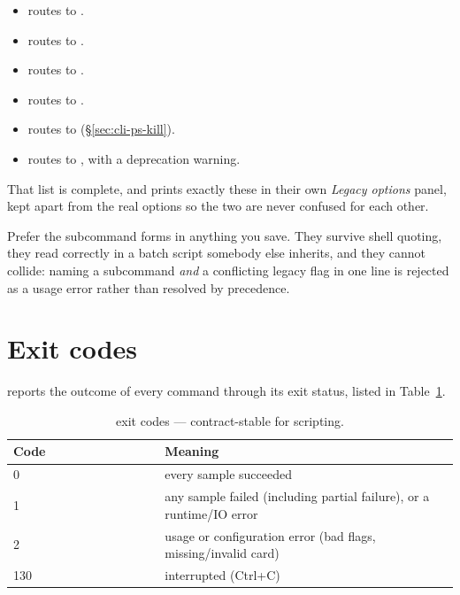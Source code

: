 \begin{itemize}
  \item {} routes to .
  \item {} routes to .
  \item {} routes to .
  \item {} routes to .
  \item {} routes to  (\S\ref{sec:cli-ps-kill}).
  \item {} routes to , with a deprecation
        warning.
\end{itemize}

That list is complete, and  prints exactly these in their own
\emph{Legacy options} panel, kept apart from the real options so the two are never
confused for each other.

Prefer the subcommand forms in anything you save. They survive shell quoting, they read
correctly in a batch script somebody else inherits, and they cannot collide: naming a
subcommand \emph{and} a conflicting legacy flag in one line is rejected as a usage error
rather than resolved by precedence.

\section{Exit codes}
\label{sec:exit-codes}

 reports the outcome of every command through its exit status, listed in
Table~\ref{tab:exit-codes}.

\begin{table}[ht]
  \footnotesize
  \begingroup
  \setlength{\tabcolsep}{0pt}
  \begin{tabular}{@{}p{0.34\linewidth}p{0.66\linewidth}@{}}
    \toprule
    \textbf{Code} & \textbf{Meaning} \\
    \midrule
    0   & every sample succeeded \\
    1   & any sample failed (including partial failure), or a runtime/IO error \\
    2   & usage or configuration error (bad flags, missing/invalid card) \\
    130 & interrupted (Ctrl+C) \\
    \bottomrule
  \end{tabular}
  \endgroup
  \caption{ exit codes --- contract-stable for scripting.}
  \label{tab:exit-codes}
\end{table}

